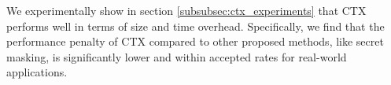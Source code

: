 We experimentally show in section \ref{subsubsec:ctx_experiments} that CTX
performs well in terms of size and time overhead. Specifically, we find that the
performance penalty of CTX compared to other proposed methods, like secret
masking, is significantly lower and within accepted rates for real-world
applications.
